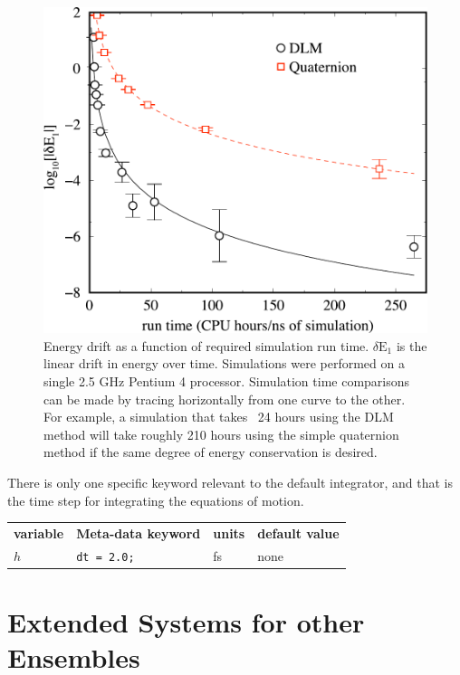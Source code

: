 \documentclass[letterpaper]{report}
\begin{document}
\begin{figure}
\centering
\includegraphics[width=\linewidth]{compCost.pdf}
\caption[Energy drift as a function of required simulation run 
time]{Energy drift as a function of required simulation run time.
$\delta \mathrm{E}_1$ is the linear drift in energy over time.
Simulations were performed on a single 2.5 GHz Pentium 4
processor. Simulation time comparisons can be made by tracing
horizontally from one curve to the other. For example, a simulation
that takes ~24 hours using the DLM method will take roughly 210
hours using the simple quaternion method if the same degree of energy
conservation is desired.}
\label{cpuCost}
\end{figure}

There is only one specific keyword relevant to the default integrator,
and that is the time step for integrating the equations of motion.

\begin{center}
\begin{tabular}{llll}
\textbf{variable} & \textbf{Meta-data keyword} & \textbf{units} &
                                                                  \textbf{default value} \\
$h$ & {\tt dt = 2.0;} & fs & none 
\end{tabular}
\end{center}

\section{\label{sec:extended}Extended Systems for other Ensembles}
\end{document}
